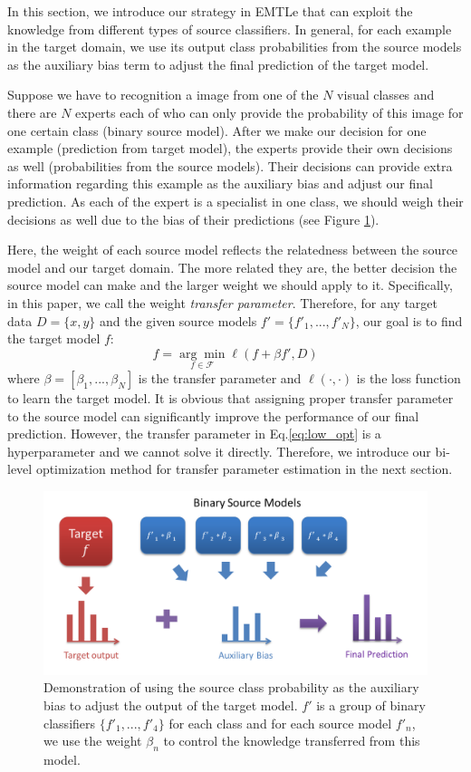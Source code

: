 In this section, we introduce our strategy in EMTLe that can exploit the knowledge from different types of source classifiers. In general, for each example in the target domain, we use its output class probabilities from the source models as the auxiliary bias term to adjust the final prediction of the target model.

Suppose we have to recognition a image from one of the $N$ visual classes and there are $N$ experts each of who can only provide the probability of this image for one certain class (binary source model). After we make our decision for one example (prediction from target model), the experts provide their own decisions as well (probabilities from the source models). Their decisions can provide extra information regarding this example as the auxiliary bias and adjust our final prediction.
As each of the expert is a specialist in one class, we should weigh their decisions as well due to the bias of their predictions (see Figure \ref{fig:ab}). 

Here, the weight of each source model reflects the relatedness between the source model and our target domain. The more related they are, the better decision the source model can make and the larger weight we should apply to it. Specifically, in this paper, we call the weight \textit{transfer parameter}. Therefore, for any target data $D=\{x,y\}$ and the given source models $f'=\{f'_1,...,f'_N\}$, our goal is to find the target model $f$:
\begin{equation}\label{eq:low_opt}
f=\underset{f \in \mathcal{F}}{\arg \min}\ell\left(f+\beta f',D\right)
\end{equation} 
where $\beta=[\beta_1,...,\beta_N]$ is the transfer parameter and $\ell(\cdot,\cdot)$ is the loss function to learn the target model.
It is obvious that assigning proper transfer parameter to the source model can significantly improve the performance of our final prediction.
However, the transfer parameter in Eq.\eqref{eq:low_opt} is a hyperparameter and we cannot solve it directly. Therefore, we introduce our bi-level optimization method for transfer parameter estimation in the next section.


\begin{figure}
	\centering
	\includegraphics[scale=0.5]{fig/ab.png}
	\caption{Demonstration of using the source class probability as the auxiliary bias to adjust the output of the target model. $f'$ is a group of binary classifiers $\{f'_1,...,f'_4\}$ for each class and for each source model $f'_n$, we use the weight $\beta_n$ to control the knowledge transferred from this model.}
	\label{fig:ab}
\end{figure}


